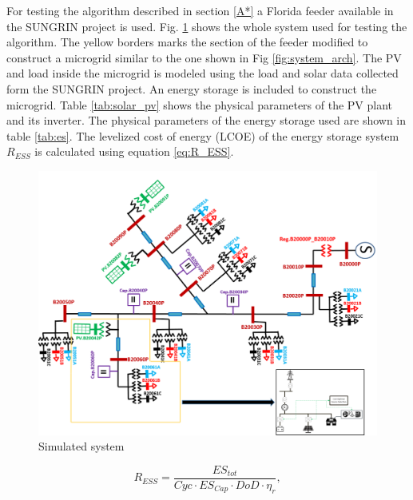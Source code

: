 For testing the algorithm described in section \ref{A*} a Florida feeder available in the SUNGRIN project \cite{SUNGRIN} is used. Fig. \ref{fig:simulation_grid} shows the whole system used for testing the algorithm. The yellow borders marks the section of the feeder modified to construct a microgrid similar to the one shown in Fig \ref{fig:system_arch}. The PV and load inside the microgrid is modeled using the load and solar data collected form the SUNGRIN project. An energy storage is included to construct the microgrid. Table \ref{tab:solar_pv} shows the physical parameters of the PV plant and its inverter. The physical parameters of the energy storage used are shown in table \ref{tab:es}. The levelized cost of energy (LCOE)  of the energy storage system $R_{ESS}$ is calculated using equation \ref{eq:R_ESS}.

\begin{figure}[!ht]
    \centering
    \includegraphics[width = \linewidth]{figs/simulation_grid.png}
    \caption{Simulated system}
    \label{fig:simulation_grid}
\end{figure}


\begin{equation}
\label{eq:R_ESS}
R_{ESS} = \dfrac{ES_{tot}}{Cyc\cdot ES_{Cap}\cdot DoD\cdot \eta_{r}},
\end{equation}

